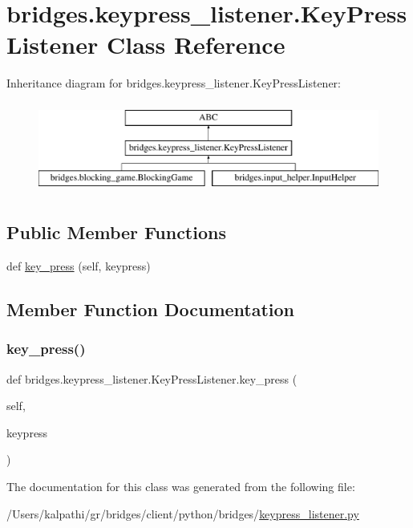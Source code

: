\hypertarget{classbridges_1_1keypress__listener_1_1_key_press_listener}{}\section{bridges.\+keypress\+\_\+listener.\+Key\+Press\+Listener Class Reference}
\label{classbridges_1_1keypress__listener_1_1_key_press_listener}
Inheritance diagram for bridges.\+keypress\+\_\+listener.\+Key\+Press\+Listener\+:\begin{figure}[H]
\begin{center}
\leavevmode
\includegraphics[height=3.000000cm]{classbridges_1_1keypress__listener_1_1_key_press_listener}
\end{center}
\end{figure}
\subsection*{Public Member Functions}
\begin{DoxyCompactItemize}
\item 
def \mbox{\hyperlink{classbridges_1_1keypress__listener_1_1_key_press_listener_a0a7b29de00fd412da075d30b8aa61f0d}{key\+\_\+press}} (self, keypress)
\end{DoxyCompactItemize}


\subsection{Member Function Documentation}
\mbox{\label{classbridges_1_1keypress__listener_1_1_key_press_listener_a0a7b29de00fd412da075d30b8aa61f0d}} 
\subsubsection{\texorpdfstring{key\+\_\+press()}{key\_press()}}
{\footnotesize\ttfamily def bridges.\+keypress\+\_\+listener.\+Key\+Press\+Listener.\+key\+\_\+press (\begin{DoxyParamCaption}\item[{}]{self,  }\item[{}]{keypress }\end{DoxyParamCaption})}



The documentation for this class was generated from the following file\+:\begin{DoxyCompactItemize}
\item 
/\+Users/kalpathi/gr/bridges/client/python/bridges/\mbox{\hyperlink{keypress__listener_8py}{keypress\+\_\+listener.\+py}}\end{DoxyCompactItemize}
